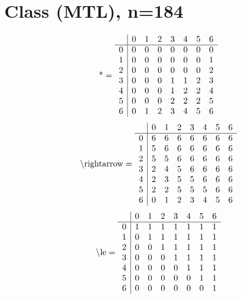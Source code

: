 \documentclass[11pt]{article}
\begin{document}
\section{Class (MTL), n=184}
\[\text{*} = 
\begin{array}{r | r r r r r r r}
 & 0 & 1 & 2 & 3 & 4 & 5 & 6 \\ \hline
0 & 0 & 0 & 0 & 0 & 0 & 0 & 0 \\
1 & 0 & 0 & 0 & 0 & 0 & 0 & 1 \\
2 & 0 & 0 & 0 & 0 & 0 & 0 & 2 \\
3 & 0 & 0 & 0 & 1 & 1 & 2 & 3 \\
4 & 0 & 0 & 0 & 1 & 2 & 2 & 4 \\
5 & 0 & 0 & 0 & 2 & 2 & 2 & 5 \\
6 & 0 & 1 & 2 & 3 & 4 & 5 & 6 \\
\end{array}
\]
\[\text{\textbackslash rightarrow} = 
\begin{array}{r | r r r r r r r}
 & 0 & 1 & 2 & 3 & 4 & 5 & 6 \\ \hline
0 & 6 & 6 & 6 & 6 & 6 & 6 & 6 \\
1 & 5 & 6 & 6 & 6 & 6 & 6 & 6 \\
2 & 5 & 5 & 6 & 6 & 6 & 6 & 6 \\
3 & 2 & 4 & 5 & 6 & 6 & 6 & 6 \\
4 & 2 & 3 & 5 & 5 & 6 & 6 & 6 \\
5 & 2 & 2 & 5 & 5 & 5 & 6 & 6 \\
6 & 0 & 1 & 2 & 3 & 4 & 5 & 6 \\
\end{array}
\]
\[\text{\textbackslash le} = 
\begin{array}{r | r r r r r r r}
 & 0 & 1 & 2 & 3 & 4 & 5 & 6 \\ \hline
0 & 1 & 1 & 1 & 1 & 1 & 1 & 1 \\
1 & 0 & 1 & 1 & 1 & 1 & 1 & 1 \\
2 & 0 & 0 & 1 & 1 & 1 & 1 & 1 \\
3 & 0 & 0 & 0 & 1 & 1 & 1 & 1 \\
4 & 0 & 0 & 0 & 0 & 1 & 1 & 1 \\
5 & 0 & 0 & 0 & 0 & 0 & 1 & 1 \\
6 & 0 & 0 & 0 & 0 & 0 & 0 & 1 \\
\end{array}
\]
\end{document}
